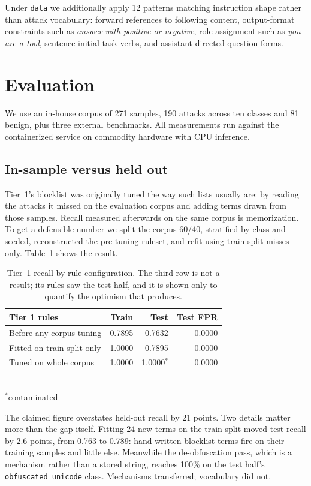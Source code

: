 \documentclass[sigconf,anonymous,review]{acmart}
\begin{document}
Under \texttt{data} we additionally apply 12 patterns matching instruction shape
rather than attack vocabulary: forward references to following content,
output-format constraints such as \emph{answer with positive or negative}, role
assignment such as \emph{you are a tool}, sentence-initial task verbs, and
assistant-directed question forms.

\section{Evaluation}

We use an in-house corpus of 271 samples, 190 attacks across ten classes and 81
benign, plus three external benchmarks. All measurements run against the
containerized service on commodity hardware with CPU inference.

\subsection{In-sample versus held out}
\label{sec:heldout}

Tier~1's blocklist was originally tuned the way such lists usually are: by
reading the attacks it missed on the evaluation corpus and adding terms drawn
from those samples. Recall measured afterwards on the same corpus is
memorization. To get a defensible number we split the corpus 60/40, stratified by
class and seeded, reconstructed the pre-tuning ruleset, and refit using
train-split misses only. Table~\ref{tab:heldout} shows the result.

\begin{table}[t]
\caption{Tier~1 recall by rule configuration. The third row is not a result; its
rules saw the test half, and it is shown only to quantify the optimism that
produces.}
\label{tab:heldout}
\small
\begin{tabular}{lrrr}
\toprule
Tier 1 rules & Train & Test & Test FPR \\
\midrule
Before any corpus tuning    & 0.7895 & 0.7632 & 0.0000 \\
Fitted on train split only  & 1.0000 & 0.7895 & 0.0000 \\
Tuned on whole corpus       & 1.0000 & 1.0000$^{*}$ & 0.0000 \\
\bottomrule
\end{tabular}
\\[2pt]
\footnotesize $^{*}$contaminated
\end{table}

The claimed figure overstates held-out recall by 21 points. Two details matter
more than the gap itself. Fitting 24 new terms on the train split moved test
recall by 2.6 points, from 0.763 to 0.789: hand-written blocklist terms fire on
their training samples and little else. Meanwhile the de-obfuscation pass, which
is a mechanism rather than a stored string, reaches 100\% on the test half's
\texttt{obfuscated\_unicode} class. Mechanisms transferred; vocabulary did not.
\end{document}
